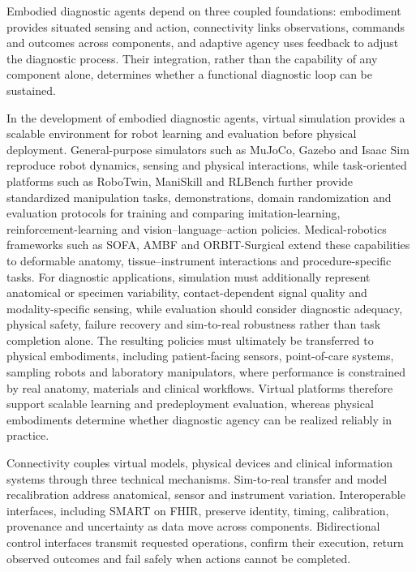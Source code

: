 \documentclass[12pt,a4paper]{article}
\begin{document}

Embodied diagnostic agents depend on three coupled foundations: embodiment provides situated sensing and action, connectivity links observations, commands and outcomes across components, and adaptive agency uses feedback to adjust the diagnostic process. Their integration, rather than the capability of any component alone, determines whether a functional diagnostic loop can be sustained.

In the development of embodied diagnostic agents, virtual simulation provides a scalable environment for robot learning and evaluation before physical deployment. General-purpose simulators such as MuJoCo, Gazebo and Isaac Sim reproduce robot dynamics, sensing and physical interactions, while task-oriented platforms such as RoboTwin, ManiSkill and RLBench further provide standardized manipulation tasks, demonstrations, domain randomization and evaluation protocols for training and comparing imitation-learning, reinforcement-learning and vision--language--action policies. Medical-robotics frameworks such as SOFA, AMBF and ORBIT-Surgical extend these capabilities to deformable anatomy, tissue--instrument interactions and procedure-specific tasks. For diagnostic applications, simulation must additionally represent anatomical or specimen variability, contact-dependent signal quality and modality-specific sensing, while evaluation should consider diagnostic adequacy, physical safety, failure recovery and sim-to-real robustness rather than task completion alone. The resulting policies must ultimately be transferred to physical embodiments, including patient-facing sensors, point-of-care systems, sampling robots and laboratory manipulators, where performance is constrained by real anatomy, materials and clinical workflows. Virtual platforms therefore support scalable learning and predeployment evaluation, whereas physical embodiments determine whether diagnostic agency can be realized reliably in practice.

Connectivity couples virtual models, physical devices and clinical information systems through three technical mechanisms. Sim-to-real transfer and model recalibration address anatomical, sensor and instrument variation. Interoperable interfaces, including SMART on FHIR, preserve identity, timing, calibration, provenance and uncertainty as data move across components. Bidirectional control interfaces transmit requested operations, confirm their execution, return observed outcomes and fail safely when actions cannot be completed.
\end{document}
